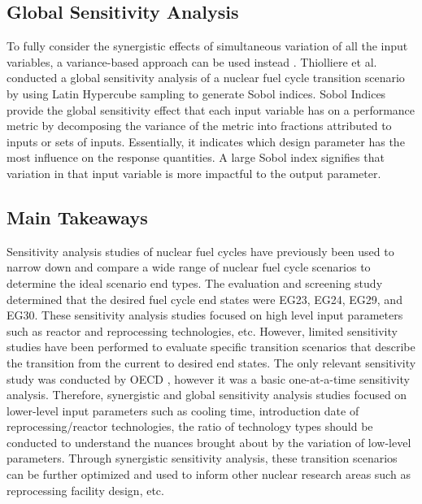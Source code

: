 \subsection{Global Sensitivity Analysis}
\label{sec:sobol}
To fully consider the synergistic effects of
simultaneous variation of all the input variables, a variance-based 
approach can be used instead \cite{thiolliere_methodology_2018}.
Thiolliere et al. conducted a global sensitivity analysis of a 
nuclear fuel cycle transition scenario by using Latin Hypercube sampling 
to generate Sobol indices. 
Sobol Indices provide the global sensitivity effect that each 
input variable has on a performance metric by decomposing the 
variance of the metric into fractions attributed to inputs or sets of inputs.
Essentially, it indicates which design parameter has 
the most influence on the response quantities.
A large Sobol index signifies that variation in that input 
variable is more impactful to the output parameter.

\subsection{Main Takeaways}
Sensitivity analysis studies of nuclear fuel cycles have previously been used to narrow 
down and compare a wide range of nuclear fuel cycle scenarios to determine 
the ideal scenario end types. 
The evaluation and screening study determined that the desired 
fuel cycle end states were EG23, EG24, EG29, and EG30.
These sensitivity analysis studies focused on high level input 
parameters such as reactor and reprocessing technologies, etc.
However, limited sensitivity studies have been performed to 
evaluate specific transition scenarios that describe the transition 
from the current to desired end states.
The only relevant sensitivity study was conducted by OECD 
\cite{noauthor_effects_2017}, however it was a basic one-at-a-time 
sensitivity analysis.   
Therefore, synergistic and global sensitivity analysis studies focused on
lower-level input parameters such as cooling time, 
introduction date of reprocessing/reactor 
technologies, the ratio of technology types should be conducted to 
understand the nuances brought about by the variation of low-level parameters. 
Through synergistic sensitivity analysis, these transition scenarios can be 
further optimized and used to inform other nuclear research areas 
such as reprocessing facility design, etc. 
